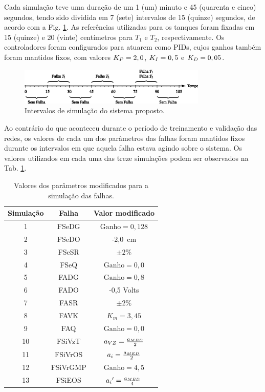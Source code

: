 Cada simulação teve uma duração de um 1 (um) minuto e 45 (quarenta e cinco)
segundos, tendo sido dividida em 7 (sete) intervalos de 15 (quinze) segundos, de
acordo com a Fig. \ref{fig:intervalos}. As referências utilizadas para os
tanques foram fixadas em 15 (quinze) e 20 (vinte) centímetros para $T_1$ e
$T_2$, respectivamente. Os controladores foram configurados para atuarem como
PIDs, cujos ganhos também foram mantidos fixos, com valores $K_{\tiny P} = 2,0$,
$K_{\tiny I} = 0,5$ e $K_{\tiny D} = 0,05$.

\begin{figure}[htb]
\centering
    \includegraphics[width=0.8\textwidth]{imgs/resultados/eps/intervalos}
    \caption{Intervalos de simulação do sistema proposto.}
    \label{fig:intervalos}
\end{figure}

Ao contrário do que aconteceu durante o período de treinamento e validação das
redes, os valores de cada um dos parâmetros das falhas foram mantidos fixos
durante os intervalos em que aquela falha estava agindo sobre o sistema. Os
valores utilizados em cada uma das treze simulações podem ser observados na Tab.
\ref{tab:valores_parametros}.

\begin{table}[htb]
\centering
\caption{Valores dos parâmetros modificados para a simulação das falhas.}
\label{tab:valores_parametros}
\vspace{0.25cm}
\begin{tabular}{|c|c|c|}
\hline
{\bf Simulação} & {\bf Falha} & {\bf Valor modificado}\\
\hline
\hline
1 & FSeDG & $\text{Ganho} = 0,128$\\
\hline
2 & FSeDO & -2,0\ cm\\
\hline
3 & FSeSR & $\pm 2\%$\\
\hline
4 & FSeQ & $\text{Ganho} = 0,0$\\
\hline
\hline
5 & FADG & $\text{Ganho} = 0,8$\\
\hline
6 & FADO & -0,5 Volts\\
\hline
7 & FASR & $\pm 2\%$\\
\hline
8 & FAVK & $K_m = 3,45$\\ 
\hline
9 & FAQ & $\text{Ganho} = 0,0$\\
\hline
\hline
10 & FSiVzT & $a_{\tiny VZ} = \frac{a_{\tiny MED}}{2}$\\
\hline
11 & FSiVrOS & $a_i = \frac{a_{\tiny MED}}{2}$\\
\hline
12 & FSiVrGMP & $\text{Ganho} = 4,5$\\
\hline
13 & FSiEOS & ${a_i}' = \frac{a_{\tiny MED}}{4}$\\
\hline
\end{tabular}
\end{table}

